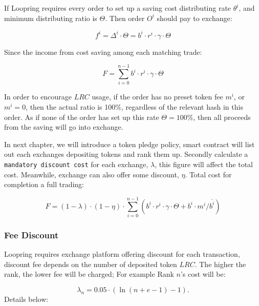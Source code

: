 \documentclass[UTF8,nofonts]{article}
\begin{document}
If Loopring requires every order to set up a saving cost distributing rate $\theta^i$, and minimum distributing ratio is $\Theta$. Then order $O^i$ should pay to exchange: 


\begin{equation*}
f^i = \Delta^i \cdot \Theta = b^i \cdot r^i \cdot \gamma \cdot \Theta
\end{equation*}

Since the income from cost saving among each matching trade:

\begin{equation*}
F = \sum^{n-1}_{i=0} b^i \cdot r^i \cdot \gamma \cdot \Theta
\end{equation*}

In order to encourage $LRC$ usage,  if the order has no preset token fee $m^i$, or $m^i=0$, then the actual ratio is 100\%,  regardless of the relevant hash in this order. As if none of the order has set up this rate $\Theta=100\%$,  then all proceeds from the saving will go into exchange.

In next chapter,  we will introduce a token pledge policy,  smart contract will list out each exchanges depositing tokens and rank them up. Secondly calculate a \texttt{mandatory discount cost} for each exchange, $\lambda$, this figure will affect the total cost. Meanwhile, exchange can also offer some discount, $\eta$. Total cost for completion a full trading: 

\begin{equation*}
F =(1-\lambda)\cdot (1-\eta) \cdot \sum^{n-1}_{i=0} (b^i \cdot r^i \cdot \gamma \cdot \Theta + b^i \cdot m^i / \overline{b^i})
\end{equation*}


\subsubsection{Fee Discount}
Loopring requires exchange platform offering discount for each transaction,  discount fee depends on the number of deposited token $LRC$. The higher the rank,  the lower fee will be charged; For example Rank $n$'s cost will be:

$$\lambda_{n} = 0.05\cdot(\ln (n+e-1) - 1)\text{.}$$
Details below:
\end{document}
